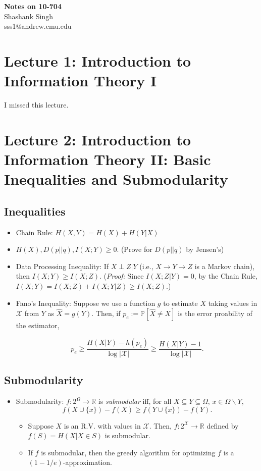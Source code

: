 \documentclass{article}
\newcommand{\sminus}{\backslash}                    %
\newcommand{\R}{\mathbb{R}}                         %
\newcommand{\X}{\mathcal{X}}                        %
\newcommand{\pr}{\mathbb{P}}                        %
\begin{document}
\begin{center}
{\bf\Large Notes on 10-704}\\
Shashank Singh\\
sss1@andrew.cmu.edu\\
\end{center}

\section{Lecture 1: Introduction to Information Theory I}
I missed this lecture.

\section{Lecture 2: Introduction to Information Theory II: Basic Inequalities
and Submodularity}
\subsection{Inequalities}
\begin{itemize}
\item Chain Rule: $H(X,Y) = H(X) + H(Y|X)$
\item $H(X), D(p||q), I(X;Y) \geq 0$. (Prove for $D(p||q)$ by Jensen's)
\item Data Processing Inequality: If $X \perp Z | Y$ (i.e., $X \to Y \to Z$ is
a Markov chain), then $I(X;Y) \geq I(X;Z)$. (\emph{Proof:} Since
$I(X;Z|Y) = 0$, by the Chain Rule, $I(X;Y) = I(X;Z) + I(X;Y|Z) \geq I(X;Z)$.)
\item Fano's Inequality: Suppose we use a function $g$ to estimate $X$ taking
values in $\X$ from $Y$ as $\hat X = g(Y)$. Then, if
$p_e := \pr[\hat X \neq X]$ is the error proability of the estimator,

\[p_e
    \geq \frac{H(X|Y) - h(p_e)}{\log|\X|}
    \geq \frac{H(X|Y) - 1}{\log|\X|}.\]
\end{itemize}
\subsection{Submodularity}
\begin{itemize}
\item Submodularity: $f : 2^\Omega \to \R$ is \emph{submodular} iff, for all
$X \subseteq Y \subseteq \Omega$, $x \in \Omega \sminus Y$,
\[f(X \cup \{x\}) - f(X) \geq f(Y \cup \{x\}) - f(Y).\]
\begin{itemize}
\item Suppose $X$ is an R.V. with values in $\X$. Then, $f : 2^\X \to \R$
defined by $f(S) = H(X | X \in S)$ is submodular.
\item If $f$ is submodular, then the greedy algorithm for optimizing $f$ is
a $(1 - 1/e)$-approximation.
\end{itemize}
\end{itemize}
\end{document}
